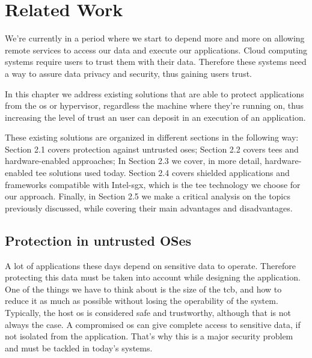 \chapter{Related Work}
\label{cha:related_work}

We’re currently in a period where we start to depend more and more on allowing remote services to access our data and execute our applications. Cloud computing systems require users to trust them with their data. Therefore these systems need a way to assure data privacy
and security, thus gaining users trust.

In this chapter we address existing solutions that are able to protect applications from the \gls{os} or hypervisor, regardless the machine where they're running on, thus increasing the level of trust an user can deposit in an execution of an application.

These existing solutions are organized in different sections in the following way: 
Section 2.1 covers protection against untrusted \gls{os}es; 
Section 2.2 covers \gls{tee}s and hardware-enabled approaches;
In Section 2.3 we cover, in more detail, hardware-enabled \gls{tee} solutions used today.
Section 2.4 covers shielded applications and frameworks compatible with Intel-\gls{sgx}, which is the \gls{tee} technology we choose for our approach.
Finally, in Section 2.5 we make a critical analysis on the topics previously discussed, while covering their main advantages and disadvantages.




\section{Protection in untrusted OSes}

A lot of applications these days depend on sensitive data to operate. Therefore protecting this data must be taken into account while designing the application. 
One of the things we have to think about is the size of the \gls{tcb}, and how to reduce it as much as possible without losing the operability of the system. 
Typically, the host \gls{os} is considered safe and trustworthy, although that is not always the case. A compromised \gls{os} can give complete access to sensitive data, if not isolated from the application. That’s why this is a major security problem and must be tackled in today’s systems.

